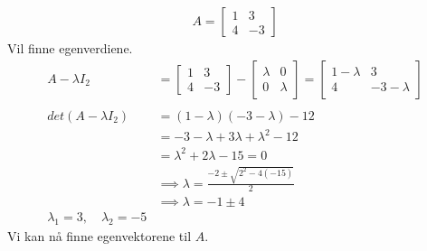 \documentclass[11pt, a4paper, norsk]{article}
\begin{document}
        \begin{Example}{}{}
            \begin{align*}
                A = \begin{bmatrix}
                    1 & 3 \\
                    4 & -3
                \end{bmatrix}
            \end{align*}
            Vil finne egenverdiene.
            \begin{align*}
                A - \lambda I_{2} &= \begin{bmatrix}
                    1 & 3 \\
                    4 & -3
                \end{bmatrix}- \begin{bmatrix}
                    \lambda & 0 \\
                    0 & \lambda
                \end{bmatrix} = \begin{bmatrix}
                    1-\lambda & 3 \\
                    4 & -3-\lambda
                \end{bmatrix}
                \\
                \\
                    det(A-\lambda I_{2}) &= (1-\lambda)(-3-\lambda) - 12
                    \\
                                         &= -3 - \lambda + 3\lambda + \lambda^2 - 12
                                         \\
                                         &= \lambda^2 + 2\lambda - 15 = 0
                                         \\
                                         &\implies \lambda = \frac{-2 \pm \sqrt{2^2 - 4(-15)}}{2}
                                         \\
                                         &\implies \lambda = -1 \pm 4
                                         \\
                                         \lambda_{1} = 3, \quad \lambda_{2} = -5
            \end{align*}
            Vi kan nå finne egenvektorene til $A$. 


\end{Example}
\end{document}
